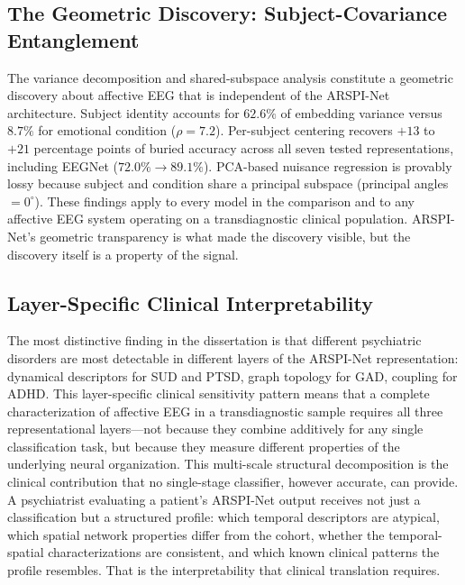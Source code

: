 \subsection{The Geometric Discovery: Subject-Covariance Entanglement}

The variance decomposition and shared-subspace analysis constitute a geometric discovery about affective EEG that is independent of the ARSPI-Net architecture. Subject identity accounts for $62.6\%$ of embedding variance versus $8.7\%$ for emotional condition ($\rho = 7.2$). Per-subject centering recovers $+13$ to $+21$ percentage points of buried accuracy across all seven tested representations, including EEGNet ($72.0\% \to 89.1\%$). PCA-based nuisance regression is provably lossy because subject and condition share a principal subspace (principal angles $= 0^\circ$). These findings apply to every model in the comparison and to any affective EEG system operating on a transdiagnostic clinical population. ARSPI-Net's geometric transparency is what made the discovery visible, but the discovery itself is a property of the signal.

\subsection{Layer-Specific Clinical Interpretability}

The most distinctive finding in the dissertation is that different psychiatric disorders are most detectable in different layers of the ARSPI-Net representation: dynamical descriptors for SUD and PTSD, graph topology for GAD, coupling for ADHD. This layer-specific clinical sensitivity pattern means that a complete characterization of affective EEG in a transdiagnostic sample requires all three representational layers---not because they combine additively for any single classification task, but because they measure different properties of the underlying neural organization. This multi-scale structural decomposition is the clinical contribution that no single-stage classifier, however accurate, can provide. A psychiatrist evaluating a patient's ARSPI-Net output receives not just a classification but a structured profile: which temporal descriptors are atypical, which spatial network properties differ from the cohort, whether the temporal-spatial characterizations are consistent, and which known clinical patterns the profile resembles. That is the interpretability that clinical translation requires.

